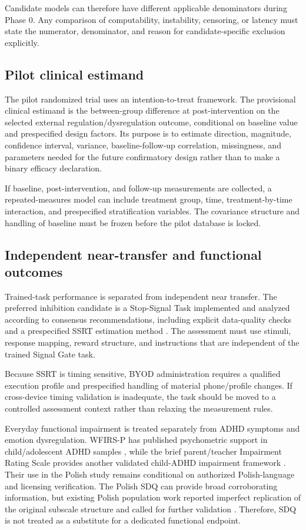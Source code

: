 Candidate models can therefore have different applicable denominators during Phase 0. Any comparison of computability, instability, censoring, or latency must state the numerator, denominator, and reason for candidate-specific exclusion explicitly.

\subsection{Pilot clinical estimand}

The pilot randomized trial uses an intention-to-treat framework. The provisional clinical estimand is the between-group difference at post-intervention on the selected external regulation/dysregulation outcome, conditional on baseline value and prespecified design factors. Its purpose is to estimate direction, magnitude, confidence interval, variance, baseline-follow-up correlation, missingness, and parameters needed for the future confirmatory design rather than to make a binary efficacy declaration.

If baseline, post-intervention, and follow-up measurements are collected, a repeated-measures model can include treatment group, time, treatment-by-time interaction, and prespecified stratification variables. The covariance structure and handling of baseline must be frozen before the pilot database is locked.

\subsection{Independent near-transfer and functional outcomes}

Trained-task performance is separated from independent near transfer. The preferred inhibition candidate is a Stop-Signal Task implemented and analyzed according to consensus recommendations, including explicit data-quality checks and a prespecified SSRT estimation method \parencite{verbruggen2019stopsignal}. The assessment must use stimuli, response mapping, reward structure, and instructions that are independent of the trained Signal Gate task.

Because SSRT is timing sensitive, BYOD administration requires a qualified execution profile and prespecified handling of material phone/profile changes. If cross-device timing validation is inadequate, the task should be moved to a controlled assessment context rather than relaxing the measurement rules.

Everyday functional impairment is treated separately from ADHD symptoms and emotion dysregulation. WFIRS-P has published psychometric support in child/adolescent ADHD samples \parencite{gajria2015wfirs}, while the brief parent/teacher Impairment Rating Scale provides another validated child-ADHD impairment framework \parencite{fabiano2006irs}. Their use in the Polish study remains conditional on authorized Polish-language and licensing verification. The Polish SDQ can provide broad corroborating information, but existing Polish population work reported imperfect replication of the original subscale structure and called for further validation \parencite{mazur2007sdqpolish}. Therefore, SDQ is not treated as a substitute for a dedicated functional endpoint.

